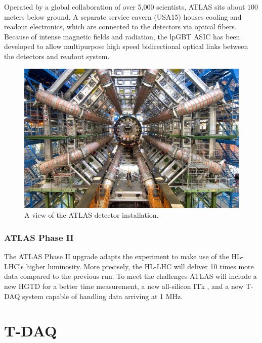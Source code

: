 Operated by a global collaboration of over 5,000 scientists, \acs{ATLAS} sits about 100 meters below ground. A separate service cavern (USA15) houses cooling and readout electronics, which are connected to the detectors via optical fibers. Because of intense magnetic fields and radiation, the \acs{lpGBT} \acs{ASIC} \cite{lpgbt} has been developed to allow multipurpose high speed bidirectional optical links between the detectors and readout system.

\begin{figure}[H]
\centering
\includegraphics[width=\textwidth]{images/introduction/atlas.jpg}
\caption{A view of the ATLAS detector installation. \protect\cite{atlas-experiment}}
\label{fig:atlas}
\end{figure}

\subsubsection{\acs{ATLAS} Phase II}

The \acs{ATLAS} Phase II upgrade \cite{Affolder:2799535} adapts the experiment to make use of the \acs{HL-LHC}'s higher luminosity. 
More precisely, the \acs{HL-LHC} will deliver 10 times more data compared to the previous run.  To meet the challenges \acs{ATLAS} will include a new \acf{HGTD} \cite{hgtd-phase2-upgrade} for a better time measurement, a new all-silicon \acf{ITk} \cite{atlas-itk-pixel-detector}, and a new \acs{T-DAQ} system capable of handling data arriving at 1 MHz.

\clearpage
\section{\acf{T-DAQ}}

